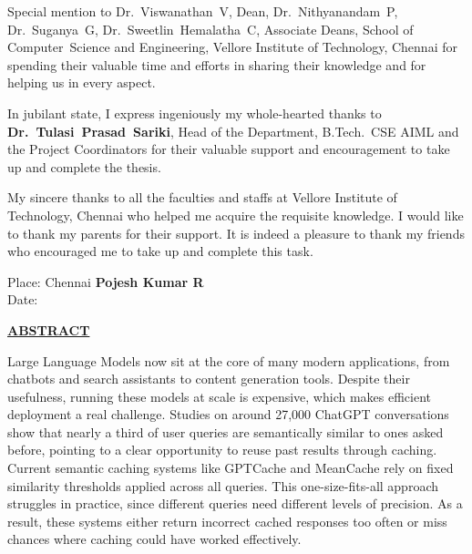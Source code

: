 \documentclass[12pt,a4paper]{report}
\begin{document}
\vspace{0.3cm}

\noindent Special mention to Dr.~Viswanathan~V, Dean, Dr.~Nithyanandam~P, Dr.~Suganya~G, Dr.~Sweetlin~Hemalatha~C, Associate Deans, School of \mbox{Computer Science} and Engineering, Vellore Institute of Technology, Chennai for spending their valuable time and efforts in sharing their knowledge and for helping us in every aspect.

\vspace{0.3cm}

\noindent In jubilant state, I express ingeniously my whole-hearted thanks to \textbf{\mbox{Dr.~Tulasi~Prasad~Sariki}}, Head of the Department, B.Tech.\ CSE AIML and the Project Coordinators for their valuable support and encouragement to take up and complete the thesis.

\vspace{0.3cm}

\noindent My sincere thanks to all the faculties and staffs at Vellore Institute of Technology, Chennai who helped me acquire the requisite knowledge. I would like to thank my parents for their support. It is indeed a pleasure to thank my friends who encouraged me to take up and complete this task.

\vspace{1.5cm}

\noindent Place: Chennai \hfill \textbf{Pojesh Kumar R}\\
\noindent Date: 

\newpage
{}
\fancyfoot[C]{\thepage}
\begin{center}
{\fontsize{14}{17}\selectfont\bfseries\underline{ABSTRACT}}
\end{center}
\vspace{0.5cm}

\noindent Large Language Models now sit at the core of many modern applications, from chatbots and search assistants to content generation tools. Despite their usefulness, running these models at scale is expensive, which makes efficient deployment a real challenge. Studies on around 27,000 ChatGPT conversations show that nearly a third of user queries are semantically similar to ones asked before, pointing to a clear opportunity to reuse past results through caching. Current semantic caching systems like GPTCache and MeanCache rely on fixed similarity thresholds applied across all queries. This one-size-fits-all approach struggles in practice, since different queries need different levels of precision. As a result, these systems either return incorrect cached responses too often or miss chances where caching could have worked effectively.
\end{document}
